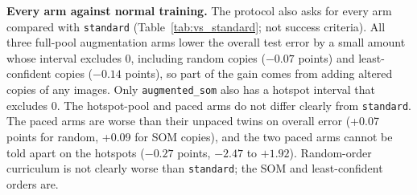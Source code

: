 \documentclass[11pt]{article}
\begin{document}




\textbf{Every arm against normal training.} The protocol also asks for every arm compared with \texttt{standard} (Table~\ref{tab:vs_standard}; not success criteria). All three full-pool augmentation arms lower the overall test error by a small amount whose interval excludes 0, including random copies ($-0.07$ points) and least-confident copies ($-0.14$ points), so part of the gain comes from adding altered copies of any images. Only \texttt{augmented\_som} also has a hotspot interval that excludes 0. The hotspot-pool and paced arms do not differ clearly from \texttt{standard}. The paced arms are worse than their unpaced twins on overall error (+0.07 points for random, +0.09 for SOM copies), and the two paced arms cannot be told apart on the hotspots ($-0.27$ points, $-2.47$ to $+1.92$). Random-order curriculum is not clearly worse than \texttt{standard}; the SOM and least-confident orders are.
\end{document}
